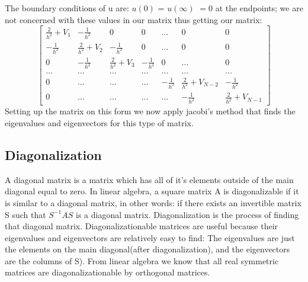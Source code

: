 \documentclass[twocolumn]{article}
\begin{document}
The boundary conditions of u are: $u(0)$ = $u(\infty)$ $= 0$ at the endpoints; we are not concerned with these values in our matrix thus getting our matrix:
\begingroup\makeatletter\def\f@size{7}\check@mathfonts
\def\maketag@@@#1{\hbox{\m@th\large\normalfont#1}}
\begin{equation*}
    \begin{bmatrix} \frac{2}{h^2}+V_1 & -\frac{1}{h^2} & 0   & 0    & \dots  &0     & 0 \\
                                -\frac{1}{h^2} & \frac{2}{h^2}+V_2 & -\frac{1}{h^2} & 0    & \dots  &0     &0 \\
                                0   & -\frac{1}{h^2} & \frac{2}{h^2}+V_3 & -\frac{1}{h^2}  &0       &\dots & 0\\
                                \dots  & \dots & \dots & \dots  &\dots      &\dots & \dots\\
                                0   & \dots & \dots & \dots  &-\frac{1}{h^2}  &\frac{2}{h^2}+V_{N-2} & -\frac{1}{h^2}\\
                                0   & \dots & \dots & \dots  &\dots       &-\frac{1}{h^2} & \frac{2}{h^2}+V_{N-1}
             \end{bmatrix}
\label{eq:matrixse} 
\end{equation*}\endgroup
Setting up the matrix on this form we now apply jacobi's method that finds the eigenvalues and eigenvectors for this type of matrix.
\subsection*{Diagonalization}
A diagonal matrix is a matrix which has all of it's elements outside of the main diagonal equal to zero.
In linear algebra, a square matrix A is diagonalizable if it is similar to a diagonal matrix, in other words: if there exists an invertible matrix S such that $S^{-1}AS$ is a diagonal matrix. Diagonalization is the process of finding that diagonal matrix. Diagonalizationable matrices are useful because their eigenvalues and eigenvectors are relatively easy to find: The eigenvalues are just the elements on the main diagonal(after diagonalization), and the eigenvectors are the columns of S).
From linear algebra we know that all real symmetric matrices are diagonalizationable by orthogonal matrices.
\end{document}
